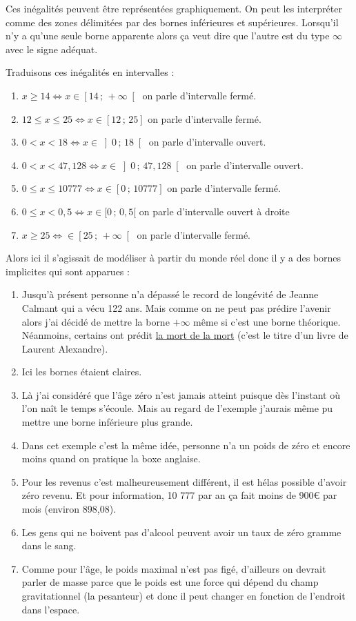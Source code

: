 \documentclass[a4paper, 11pt, twoside]{book}
\newcommand{\intr}[4]{\left #1 #2\,;\,#3 \right #4}
\begin{document}
Ces inégalités peuvent être représentées graphiquement. On peut les
interpréter comme des zones délimitées par des bornes inférieures
et supérieures. Lorsqu'il n'y a qu'une seule borne apparente alors
ça veut dire que l'autre est du type \(\infty\) avec le signe
adéquat.

Traduisons ces inégalités en intervalles :

\begin{enumerate}
\item \(x \geq 14 \iff x\in \intr{[}{14}{+\infty}{[}\) on parle d'intervalle fermé.
\item \(12 \leq x \leq 25\iff x\in \intr{[}{12}{25}{]}\) on parle d'intervalle fermé.
\item \(0 < x < 18\iff x\in \intr{]}{0}{18}{[}\) on parle d'intervalle ouvert.
\item \(0 < x < 47,128\iff x\in \intr{]}{0}{47,128}{[}\) on parle d'intervalle
ouvert.
\item \(0\leq x \leq 10 777\iff x\in \intr{[}{0}{10777}{]}\) on parle d'intervalle
fermé.
\item \(0 \leq x < 0,5\iff x\in [0\,;\,0,5[\) on parle d'intervalle ouvert à droite
\item \(x \geq 25\iff \in \intr{[}{25}{+\infty}{[}\) on parle d'intervalle fermé.
\end{enumerate}


Alors ici il s'agissait de modéliser à partir du monde réel donc il
y a des bornes implicites qui sont apparues :
\begin{enumerate}
\item Jusqu'à présent personne n'a dépassé le record de longévité de
Jeanne Calmant qui a vécu 122 ans. Mais comme on ne peut pas
prédire l'avenir alors j'ai décidé de mettre la borne \(+\infty\)
même si c'est une borne théorique. Néanmoins, certains ont
prédit \href{https://amzn.to/3OKi2os}{la mort de la mort} (c'est le titre d'un livre de Laurent
Alexandre).
\item Ici les bornes étaient claires.
\item Là j'ai considéré que l'âge zéro n'est jamais atteint puisque
dès l'instant où l'on naît le temps s'écoule. Mais au regard de
l'exemple j'aurais même pu mettre une borne inférieure plus
grande.
\item Dans cet exemple c'est la même idée, personne n'a un poids de
zéro et encore moins quand on pratique la boxe anglaise.
\item Pour les revenus c'est malheureusement différent, il est hélas
possible d'avoir zéro revenu. Et pour information, 10 777 par an
ça fait moins de 900€ par mois (environ 898,08).
\item Les gens qui ne boivent pas d'alcool peuvent avoir un taux de
zéro gramme dans le sang.
\item Comme pour l'âge, le poids maximal n'est pas figé, d'ailleurs on
devrait parler de masse parce que le poids est une force qui
dépend du champ gravitationnel (la pesanteur) et donc il peut
changer en fonction de l'endroit dans l'espace.
\end{enumerate}
\end{document}
